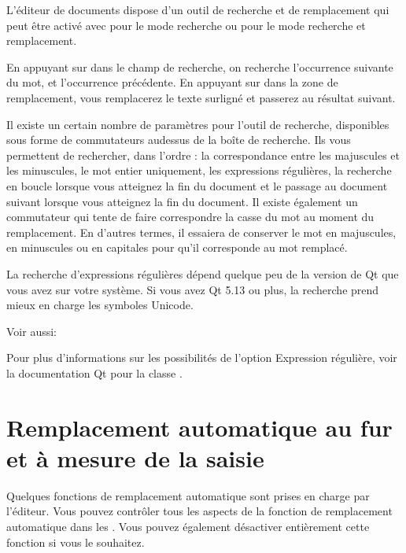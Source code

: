 \documentclass[a4paper,11pt,french]{sphinxmanual}
\begin{document}
\sphinxAtStartPar
L’éditeur de documents dispose d’un outil de recherche et de remplacement qui peut être activé avec  pour le mode recherche ou  pour le mode recherche et remplacement.

\sphinxAtStartPar
En appuyant sur  dans le champ de recherche, on recherche l’occurrence suivante du mot, et  l’occurrence précédente. En appuyant sur  dans la zone de remplacement, vous remplacerez le texte surligné et passerez au résultat suivant.

\sphinxAtStartPar
Il existe un certain nombre de paramètres pour l’outil de recherche, disponibles sous forme de commutateurs au\sphinxhyphen{}dessus de la boîte de recherche. Ils vous permettent de rechercher, dans l’ordre : la correspondance entre les majuscules et les minuscules, le mot entier uniquement, les expressions régulières, la recherche en boucle lorsque vous atteignez la fin du document et le passage au document suivant lorsque vous atteignez la fin du document. Il existe également un commutateur qui tente de faire correspondre la casse du mot au moment du remplacement. En d’autres termes, il essaiera de conserver le mot en majuscules, en minuscules ou en capitales pour qu’il corresponde au mot remplacé.

\sphinxAtStartPar
La recherche d’expressions régulières dépend quelque peu de la version de Qt que vous avez sur votre système. Si vous avez Qt 5.13 ou plus, la recherche prend mieux en charge les symboles Unicode.


\begin{sphinxseealso}{Voir aussi:}

\sphinxAtStartPar
Pour plus d’informations sur les possibilités de l’option Expression régulière, voir la documentation Qt pour la classe .


\end{sphinxseealso}



\section{Remplacement automatique au fur et à mesure de la saisie}
\label{\detokenize{usage_writing:auto-replace-as-you-type}}\label{\detokenize{usage_writing:a-ui-edit-auto}}
\sphinxAtStartPar
Quelques fonctions de remplacement automatique sont prises en charge par l’éditeur. Vous pouvez contrôler tous les aspects de la fonction de remplacement automatique dans les . Vous pouvez également désactiver entièrement cette fonction si vous le souhaitez.
\end{document}
